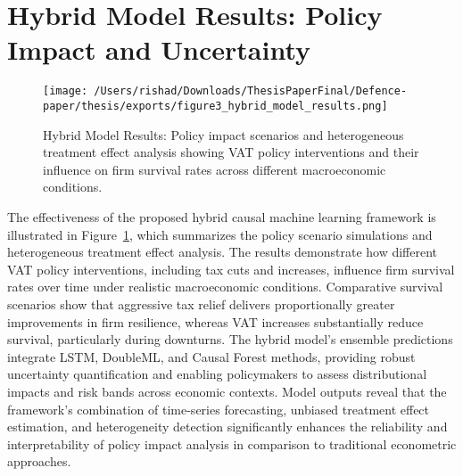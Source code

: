 \section{Hybrid Model Results: Policy Impact and Uncertainty}


\begin{figure}[htbp]
\centering
\texttt{[image: /Users/rishad/Downloads/ThesisPaperFinal/Defence-paper/thesis/exports/figure3\_hybrid\_model\_results.png]}
\caption{Hybrid Model Results: Policy impact scenarios and heterogeneous treatment effect analysis showing VAT policy interventions and their influence on firm survival rates across different macroeconomic conditions.}
\label{fig:hybrid_model_results}
\end{figure}

The effectiveness of the proposed hybrid causal machine learning framework is illustrated in Figure~\ref{fig:hybrid_model_results}, which summarizes the policy scenario simulations and heterogeneous treatment effect analysis. The results demonstrate how different VAT policy interventions, including tax cuts and increases, influence firm survival rates over time under realistic macroeconomic conditions. Comparative survival scenarios show that aggressive tax relief delivers proportionally greater improvements in firm resilience, whereas VAT increases substantially reduce survival, particularly during downturns. The hybrid model's ensemble predictions integrate LSTM, DoubleML, and Causal Forest methods, providing robust uncertainty quantification and enabling policymakers to assess distributional impacts and risk bands across economic contexts. Model outputs reveal that the framework's combination of time-series forecasting, unbiased treatment effect estimation, and heterogeneity detection significantly enhances the reliability and interpretability of policy impact analysis in comparison to traditional econometric approaches.



